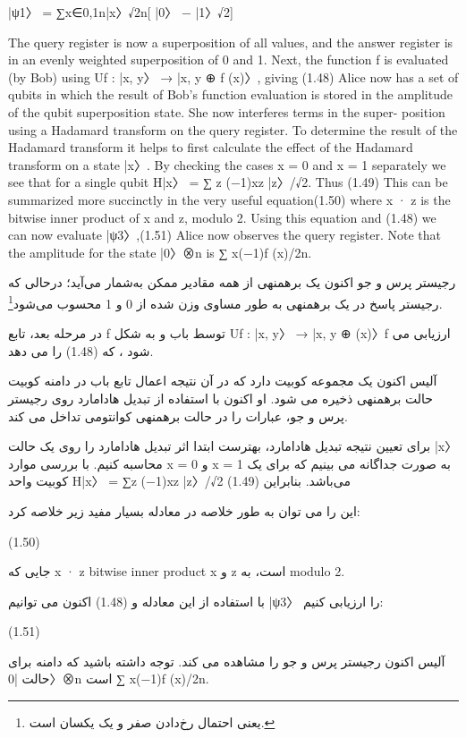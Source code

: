 \documentclass{book}
\begin{document}
	|ψ1〉 = ∑x∈{0,1}n|x〉√2n[ |0〉 − |1〉√2]
	
	
	
	The query register is now a superposition of all values, and the answer register is in an evenly weighted superposition of 0 and 1. Next, the function f is evaluated (by Bob)
	using Uf : |x, y〉 → |x, y ⊕ f (x)〉, giving (1.48) Alice now has a set of qubits in which the result of Bob’s function evaluation is stored
	in the amplitude of the qubit superposition state. She now interferes terms in the super-
	position using a Hadamard transform on the query register. To determine the result of
	the Hadamard transform it helps to first calculate the effect of the Hadamard transform
	on a state |x〉. By checking the cases x = 0 and x = 1 separately we see that for a single
	qubit H|x〉 = ∑
	z (−1)xz |z〉/√2. Thus (1.49) This can be summarized more succinctly in the very useful equation(1.50) where x · z is the bitwise inner product of x and z, modulo 2. Using this equation
	and (1.48) we can now evaluate |ψ3〉,(1.51) Alice now observes the query register. Note that the amplitude for the state |0〉⊗n is
	∑
	x(−1)f (x)/2n. 
	
	
	رجیستر پرس و جو اکنون یک برهمنهی از همه مقادیر ممکن به‌شمار می‌آید؛ درحالی که رجیستر پاسخ در یک برهمنهی به طور مساوی وزن شده از 0 و 1 محسوب می‌شود\footnote{یعنی احتمال رخ‌دادن صفر و یک یکسان است.}.
	
در مرحله بعد، تابع f توسط باب و به شکل Uf : |x, y〉 → |x, y ⊕ (x)〉f  ارزیابی می شود ، که (1.48) را می دهد.
	
	آلیس اکنون یک مجموعه کوبیت دارد که در آن نتیجه اعمال تابع باب در دامنه کوبیت حالت برهمنهی ذخیره می شود. او اکنون با استفاده از تبدیل هادامارد روی رجیستر پرس و جو، عبارات را در حالت برهمنهی کوانتومی تداخل می کند.
	
	برای تعیین نتیجه تبدیل هادامارد، بهترست ابتدا اثر تبدیل هادامارد را روی یک حالت |x〉 محاسبه کنیم. با بررسی موارد x = 0 و x = 1 به صورت جداگانه می بینیم که برای یک کوبیت واحد H|x〉 = ∑z (−1)xz |z〉/√2 می‌باشد. بنابراین (1.49)
	
	این را می توان به طور خلاصه در معادله بسیار مفید زیر خلاصه کرد:
	
	(1.50)
	
	جایی که x · z bitwise inner product x و z است، به modulo 2.
	
	با استفاده از این معادله و (1.48) اکنون می توانیم |ψ3〉 را ارزیابی کنیم:
	
	(1.51)
	
	آلیس اکنون رجیستر پرس و جو را مشاهده می کند. توجه داشته باشید که دامنه برای حالت |0〉⊗n است
	∑
	x(−1)f (x)/2n.
	
\end{document}
